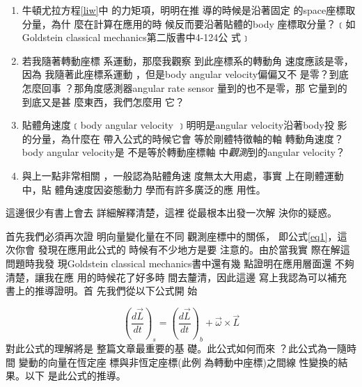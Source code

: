 \documentclass[12pt,twoside]{article}
\begin{document}
\begin{enumerate}
\item 牛頓尤拉方程\ref{liw}中%
的力矩項，明明在推%
導的時候是沿著固定%
的space座標取分量，為什%
麼在計算在應用的時%
候反而要沿著貼體的body%
座標取分量？﹝如Goldstein
classical mechanics第二版書中4-124公%
式﹞

\item 若我隨著轉動座標%
系運動，那麼我觀察%
到此座標系的轉動角%
速度應該是零，因為%
我隨著此座標系運動%
，但是body angular velocity偏偏又不%
是零？到底怎麼回事%
？那角度感測器angular rate sensor%
量到的也不是零，那%
它量到的到底又是甚%
麼東西，我們怎麼用%
它？

\item 貼體角速度﹝body angular velocity%
﹞明明是angular velocity沿著body投%
影的分量，為什麼在%
帶入公式的時候它會%
等於剛體特徵軸的軸%
轉動角速度？body angular velocity是%
不是等於轉動座標軸%
中\emph{觀測}到的angular velocity？

\item 與上一點非常相關%
，一般認為貼體角速%
度無太大用處，事實%
上在剛體運動中，貼%
體角速度因姿態動力%
學而有許多廣泛的應%
用性。
\end{enumerate}

這邊很少有書上會去%
詳細解釋清楚，這裡%
從最根本出發一次解%
決你的疑惑。

\bigskip

首先我們必須再次證%
明向量變化量在不同%
觀測座標中的關係，%
即公式\ref{eq1}，這次你會%
發現在應用此公式的%
時候有不少地方是要%
注意的。由於當我實%
際在解這問題時我發%
現Goldstein classical mechanics書中還有幾%
點證明在應用層面還%
不夠清楚，讓我在應%
用的時候花了好多時%
間去釐清，因此這邊%
寫上我認為可以補充%
書上的推導證明。首%
先我們從以下公式開%
始

\begin{equation}
\left( \frac{d\vec{L}}{dt}\right) _{s}=\left( \frac{d\vec{L}}{dt}\right)
_{b}+\vec{\omega}\times \vec{L}  \label{eq1}
\end{equation}%
對此公式的理解將是%
整篇文章最重要的基%
礎。此公式如何而來%
？此公式為一隨時間%
變動的向量在恆定座%
標與非恆定座標(此例%
為轉動中座標)之間線%
性變換的結果。以下%
是此公式的推導。

\begin{figure}[th]
\caption{{}}
\label{firstfig}
\begin{center}
\fbox{}
\end{center}
\end{figure}
\bigskip
\end{document}

